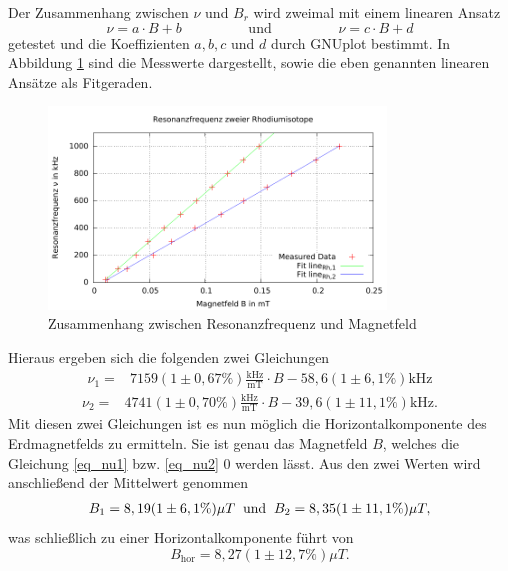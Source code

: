 Der Zusammenhang zwischen $\nu$ und $B_r$ wird zweimal mit einem linearen Ansatz
\begin{equation*}
 \nu = a\cdot B + b \hspace{2cm} \text{und} \hspace{2cm} \nu = c\cdot B + d
\end{equation*}
getestet und die Koeffizienten $a,b,c$ und $d$ durch GNUplot bestimmt. In Abbildung \ref{pic_nuB} sind die Messwerte dargestellt, sowie die eben
genannten linearen Ansätze als Fitgeraden.
\begin{figure}[h]
\includegraphics[width=0.8\textwidth]{pics/v21B-nu.pdf}
\caption{Zusammenhang zwischen Resonanzfrequenz und Magnetfeld}
\label{pic_nuB}
\end{figure}
Hieraus ergeben sich die folgenden zwei Gleichungen
\begin{align}
 \nu_1 =& 7159(1\pm0,67\%)\frac{\text{kHz}}{\text{mT}}\cdot B - 58,6(1\pm6,1\%) \text{kHz}
 \label{eq_nu1}
 \end{align}
 \begin{align}
 \nu_2 =& 4741(1\pm0,70\%)\frac{\text{kHz}}{\text{mT}}\cdot B - 39,6(1\pm11,1\%) \text{kHz}.
 \label{eq_nu2}
\end{align}
Mit diesen zwei Gleichungen ist es nun möglich die Horizontalkomponente des Erdmagnetfelds zu ermitteln. Sie ist genau das Magnetfeld $B$, welches
die Gleichung \eqref{eq_nu1} bzw. \eqref{eq_nu2} 0 werden lässt. Aus den zwei Werten wird anschließend der Mittelwert genommen
\begin{align}
 B_1 = 8,19(1\pm6,1\%) \mu T \hspace{0.2cm} \text{und} \hspace{0.2cm} B_2 = 8,35(1\pm11,1\%) \mu T,
\end{align}
was schließlich zu einer Horizontalkomponente führt von
\begin{equation}
 B_{\text{hor}} = 8,27(1\pm12,7\% )\mu T.
\end{equation}
